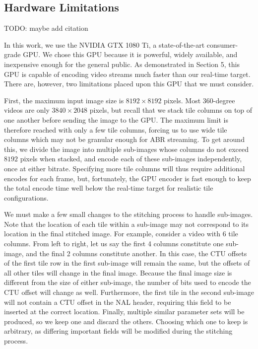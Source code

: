 \subsection{Hardware Limitations}

TODO: maybe add citation

In this work, we use the NVIDIA GTX 1080 Ti, a state-of-the-art consumer-grade GPU. We chose this GPU because it is powerful, widely available, and inexpensive enough for the general public. As demonstrated in Section 5, this GPU is capable of encoding video streams much faster than our real-time target. There are, however, two limitations placed upon this GPU that we must consider.

First, the maximum input image size is $8192\times8192$ pixels. Most 360-degree videos are only $3840\times2048$ pixels, but recall that we stack tile columns on top of one another before sending the image to the GPU. The maximum limit is therefore reached with only a few tile columns, forcing us to use wide tile columns which may not be granular enough for ABR streaming. To get around this, we divide the image into multiple sub-images whose columns do not exceed $8192$ pixels when stacked, and encode each of these sub-images independently, once at either bitrate. Specifying more tile columns will thus require additional encodes for each frame, but, fortunately, the GPU encoder is fast enough to keep the total encode time well below the real-time target for realistic tile configurations.

We must make a few small changes to the stitching process to handle sub-images. Note that the location of each tile within a sub-image may not correspond to its location in the final stitched image. For example, consider a video with 6 tile columns. From left to right, let us say the first 4 columns constitute one sub-image, and the final 2 columns constitute another. In this case, the CTU offsets of the first tile row in the first sub-image will remain the same, but the offsets of all other tiles will change in the final image. Because the final image size is different from the size of either sub-image, the number of bits used to encode the CTU offset will change as well. Furthermore, the first tile in the second sub-image will not contain a CTU offset in the NAL header, requiring this field to be inserted at the correct location. Finally, multiple similar parameter sets will be produced, so we keep one and discard the others. Choosing which one to keep is arbitrary, as differing important fields will be modified during the stitching process.

